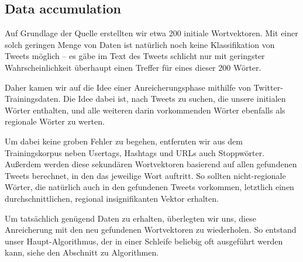\documentclass[../Main.tex]{subfiles}
\begin{document}
\subsection{Data accumulation}
Auf Grundlage der Quelle erstellten wir etwa 200 initiale Wortvektoren. Mit einer solch geringen Menge von Daten ist natürlich noch keine Klassifikation von Tweets möglich -- es gäbe im Text des Tweets schlicht nur mit geringster Wahrscheinlichkeit überhaupt einen Treffer für eines dieser 200 Wörter.

Daher kamen wir auf die Idee einer Anreicherungsphase mithilfe von Twitter-Trainingsdaten. Die Idee dabei ist, nach Tweets zu suchen, die unsere initialen Wörter enthalten, und alle weiteren darin vorkommenden Wörter ebenfalls als regionale Wörter zu werten.

Um dabei keine groben Fehler zu begehen, entfernten wir aus dem Trainingskorpus neben Usertags, Hashtags und URLs auch Stoppwörter. Außerdem werden diese sekundären Wortvektoren basierend auf allen gefundenen Tweets berechnet, in den das jeweilige Wort auftritt. So sollten nicht-regionale Wörter, die natürlich auch in den gefundenen Tweets vorkommen, letztlich einen durchschnittlichen, regional insignifikanten Vektor erhalten.

Um tatsächlich genügend Daten zu erhalten, überlegten wir uns, diese Anreicherung mit den neu gefundenen Wortvektoren zu wiederholen. So entstand unser Haupt-Algorithmus, der in einer Schleife beliebig oft ausgeführt werden kann, siehe den Abschnitt zu Algorithmen.
\end{document}
